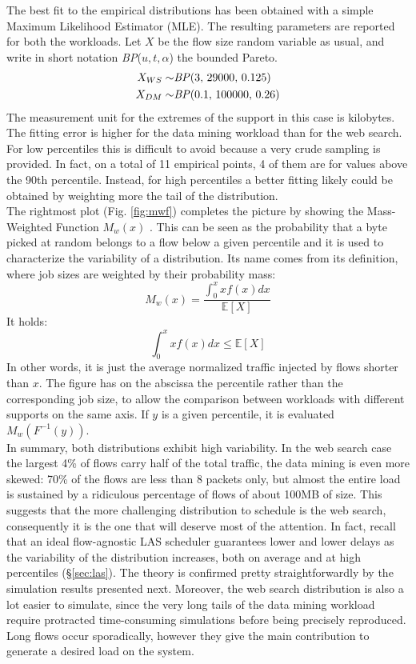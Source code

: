 The best fit to the empirical distributions has been obtained with a simple Maximum Likelihood Estimator (MLE). The resulting parameters are reported for both the workloads. Let $X$ be the flow size random variable as usual, and write in short notation \textit{BP}($u,t,\alpha$) the bounded Pareto. 
\begin{align*}
	X_{WS} \sim& \text{\textit{BP}}(3, \, 29000, \, 0.125)\\
	X_{DM} \sim& \text{\textit{BP}}(0.1, \, 100000, \,0.26)
\end{align*}
The measurement unit for the extremes of the support in this case is kilobytes. The fitting error is higher for the data mining workload than for the web search. For low percentiles this is difficult to avoid because a very crude sampling is provided. In fact, on a total of 11 empirical points, 4 of them are for values above the 90th percentile. Instead, for high percentiles a better fitting likely could be obtained by weighting more the tail of the distribution. \\
The rightmost plot (Fig. \ref{fig:mwf}) completes the picture by showing the Mass-Weighted Function $M_w(x)$ \cite{mwf}. This can be seen as the probability that a byte picked at random belongs to a flow below a given percentile and it is used to characterize the variability of a distribution. Its name comes from its definition, where job sizes are weighted by their probability mass:
\[
M_w(x) = \dfrac{\int_{0}^{x} x f(x) dx}{\mathbb{E}[X]}
\]
It holds:
\[
\int\nolimits_{0}^{x} x f(x) dx \le \mathbb{E}[X]
\]
In other words, it is just the average normalized traffic injected by flows shorter than $x$. The figure has on the abscissa the percentile rather than the corresponding job size, to allow the comparison between workloads with different supports on the same axis. If $y$ is a given percentile, it is evaluated $M_w(F^{-1}(y))$. \\
In summary, both distributions exhibit high variability. In the web search case the largest 4\% of flows carry half of the total traffic, the data mining is even more skewed: 70\% of the flows are less than 8 packets only, but almost the entire load is sustained by a ridiculous percentage of flows of about 100MB of size. This suggests that the more challenging distribution to schedule is the web search, consequently it is the one that will deserve most of the attention. In fact, recall that an ideal flow-agnostic LAS scheduler guarantees lower and lower delays as the variability of the distribution increases, both on average and at high percentiles (\S \ref{sec:las}). The theory is confirmed pretty straightforwardly by the simulation results presented next. Moreover, the web search distribution is also a lot easier to simulate, since the very long tails of the data mining workload require protracted time-consuming simulations before being precisely reproduced. Long flows occur sporadically, however they give the main contribution to generate a desired load on the system. 

